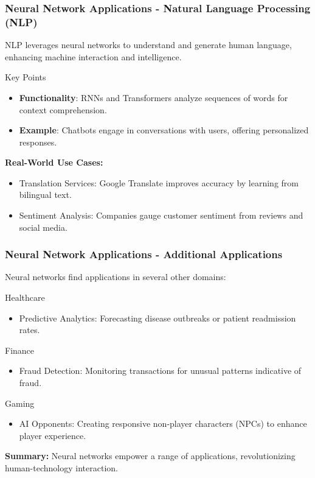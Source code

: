 \documentclass[aspectratio=169]{beamer}
\begin{document}
\begin{frame}[fragile]
    \frametitle{Neural Network Applications - Natural Language Processing (NLP)}
    NLP leverages neural networks to understand and generate human language, enhancing machine interaction and intelligence.
    
    \begin{block}{Key Points}
        \begin{itemize}
            \item \textbf{Functionality}: RNNs and Transformers analyze sequences of words for context comprehension.
            \item \textbf{Example}: Chatbots engage in conversations with users, offering personalized responses.
        \end{itemize}
    \end{block}

    \textbf{Real-World Use Cases:}
    \begin{itemize}
        \item Translation Services: Google Translate improves accuracy by learning from bilingual text.
        \item Sentiment Analysis: Companies gauge customer sentiment from reviews and social media.
    \end{itemize}
\end{frame}

\begin{frame}[fragile]
    \frametitle{Neural Network Applications - Additional Applications}
    Neural networks find applications in several other domains:
    
    \begin{block}{Healthcare}
        \begin{itemize}
            \item Predictive Analytics: Forecasting disease outbreaks or patient readmission rates.
        \end{itemize}
    \end{block}
    
    \begin{block}{Finance}
        \begin{itemize}
            \item Fraud Detection: Monitoring transactions for unusual patterns indicative of fraud.
        \end{itemize}
    \end{block}
    
    \begin{block}{Gaming}
        \begin{itemize}
            \item AI Opponents: Creating responsive non-player characters (NPCs) to enhance player experience.
        \end{itemize}
    \end{block}

    \textbf{Summary:}
    Neural networks empower a range of applications, revolutionizing human-technology interaction.
\end{frame}
\end{document}
